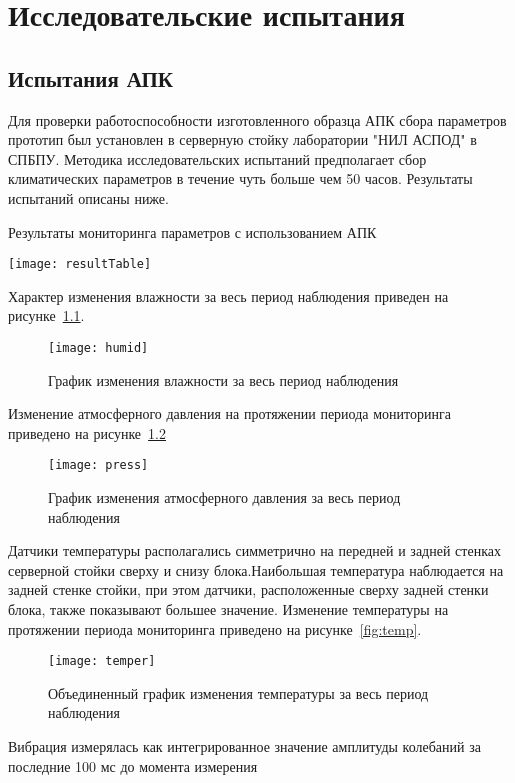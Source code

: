 
\chapter{Исследовательские испытания}


\section{Испытания АПК}
Для проверки работоспособности изготовленного образца АПК сбора параметров прототип был установлен в серверную стойку лаборатории "НИЛ АСПОД" в СПБПУ. Методика исследовательских испытаний предполагает сбор климатических параметров в течение чуть больше чем 50 часов. Результаты испытаний описаны ниже.
 
\begin{table}
	\captionsetup{skip=5pt}
	\caption{Результаты мониторинга параметров с использованием АПК}
	\centering
	\texttt{[image: resultTable]}
	\label{tab:result}
\end{table}

Характер  изменения влажности  за  весь  период  наблюдения  приведен  на  рисунке~\ref{fig:humid}.

\begin{figure}[h]
	\centering
	\texttt{[image: humid]}
	\caption{График изменения влажности за весь период наблюдения}
	\label{fig:humid}
\end{figure}

Изменение  атмосферного давления  на протяжении периода мониторинга приведено на рисунке~\ref{fig:press}

 \begin{figure}[h]
 	\centering
 	\texttt{[image: press]}
 	\caption{График изменения атмосферного давления за весь период наблюдения}
 	\label{fig:press}
 \end{figure}

Датчики  температуры  располагались  симметрично  на  передней  и задней стенках серверной стойки сверху и снизу блока.Наибольшая  температура  наблюдается  на  задней  стенке  стойки,  при этом датчики, расположенные сверху задней стенки блока, также показывают большее  значение.  Изменение  температуры  на  протяжении  периода 
мониторинга приведено на рисунке~\ref{fig:temp}.

\begin{figure}[h]
	\centering
	\texttt{[image: temper]}
	\caption{Объединенный график изменения температуры за весь период наблюдения}
	\label{fig:temper}
\end{figure}

Вибрация  измерялась  как  интегрированное  значение  амплитуды колебаний за последние 100 мс до момента измерения